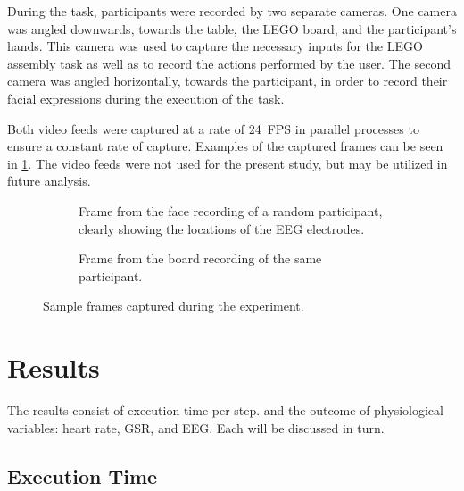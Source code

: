 \documentclass[10pt,letterpaper]{article}
\providecommand{\DIFdeltex}[1]{} %
\providecommand{\DIFdelbegin}{\protect\color{red}} %
\providecommand{\DIFdelend}{\protect\color{black}} %
\providecommand{\DIFdel}[1]{\texorpdfstring{\DIFdeltex{#1}}{}} %
\newcommand{\DIFscaledelfig}{0.5}
\newlength{\DIFdelgraphicswidth} %
\newlength{\DIFdelgraphicsheight} %
\newcommand{\DIFdelincludegraphics}[2][]{%
\sbox{\DIFdelgraphicsbox}{\DIFOincludegraphics[#1]{#2}}%
\settoboxwidth{\DIFdelgraphicswidth}{\DIFdelgraphicsbox} %
\settoboxtotalheight{\DIFdelgraphicsheight}{\DIFdelgraphicsbox} %
\scalebox{\DIFscaledelfig}{%
\parbox[b]{\DIFdelgraphicswidth}{\usebox{\DIFdelgraphicsbox}\\[-\baselineskip] \rule{\DIFdelgraphicswidth}{0em}}\llap{\resizebox{\DIFdelgraphicswidth}{\DIFdelgraphicsheight}{%
\setlength{\unitlength}{\DIFdelgraphicswidth}%
\begin{picture}(1,1)%
\thicklines\linethickness{2pt} %
{\color[rgb]{1,0,0}\put(0,0){\framebox(1,1){}}}%
{\color[rgb]{1,0,0}\put(0,0){\line( 1,1){1}}}%
{\color[rgb]{1,0,0}\put(0,1){\line(1,-1){1}}}%
\end{picture}%
}\hspace*{3pt}}} %
} %
\DeclareRobustCommand{\DIFdelbegin}{\DIFOdelbegin \let\includegraphics\DIFdelincludegraphics} %
\DeclareRobustCommand{\DIFdelend}{\DIFOaddend \let\includegraphics\DIFOincludegraphics} %
\begin{document}
During the task, participants were recorded by two separate cameras.
One camera was angled downwards, towards the table, the LEGO board, and the participant's hands.
This camera was used to capture the necessary inputs for the LEGO assembly task as well as to record the actions performed by the user.
The second camera was angled horizontally, towards the participant, in order to record their facial expressions during the execution of the task.

Both video feeds were captured at a rate of \num{24}~FPS \DIFdelbegin \DIFdel{(i.e.\ with a sampling interval of \( \SI[parse-numbers=false,per-mode=symbol]{41.\overline{6}}{\milli\second} \)) }\DIFdelend in parallel processes to ensure a constant rate of capture.
Examples of the captured frames can be seen in \cref{fig:sampleframes}.
The video feeds were not used for the present study, but may be utilized in future analysis.

\begin{figure}[h]
  \centering
  \begin{subfigure}[t]{.35\textwidth}
    \centering
    \caption{Frame from the face recording of a random participant, clearly showing the locations of the EEG electrodes.}
  \end{subfigure}%
  \hfill%
  \begin{subfigure}[t]{.60\textwidth}
    \centering
    \caption{Frame from the board recording of the same participant.}
  \end{subfigure}
  \caption{Sample frames captured during the experiment.}\label{fig:sampleframes}
\end{figure}

\section{Results}\label{sec:results}

The results consist of execution time per step. and the outcome of physiological variables: heart rate, GSR, and EEG.\@
Each will be discussed in turn.

\subsection{Execution Time}
\end{document}
